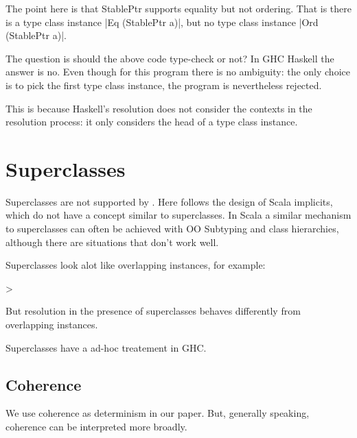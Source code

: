 The point here is that StablePtr supports equality but not ordering. That is there 
is a type class instance |Eq (StablePtr a)|, but no type class instance |Ord (StablePtr a)|. 

The question is should the above code type-check or not? In GHC Haskell the answer is no. 
Even though for this program there is no ambiguity: the only choice is to pick the first 
type class instance, the program is nevertheless rejected. 

This is because Haskell's resolution does not consider the contexts in the resolution process:
it only considers the head of a type class instance. 

\section{Superclasses}

Superclasses are not supported by \name. Here \name follows the design of Scala implicits, which 
do not have a concept similar to superclasses. In Scala a similar mechanism to 
superclasses can often be achieved with OO Subtyping and class hierarchies, although there are situations 
that don't work well.  

Superclasses look alot like overlapping instances, for example:

>

But resolution in the presence of superclasses behaves differently from overlapping instances. 

Superclasses have a ad-hoc treatement in GHC. 

\subsection{Coherence}

We use coherence as determinism in our paper. But, generally speaking, coherence can be interpreted
more broadly. 


 